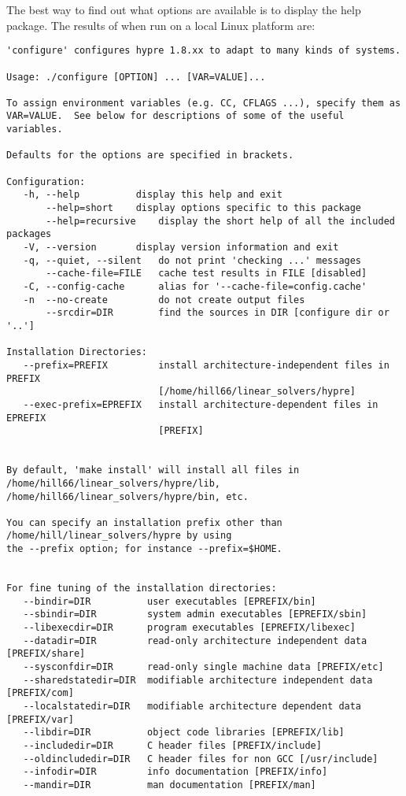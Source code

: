 The best way to find out what options are available is to display the help package.
The results of  when run on a local Linux platform are:
\begin{verbatim}
'configure' configures hypre 1.8.xx to adapt to many kinds of systems.

Usage: ./configure [OPTION] ... [VAR=VALUE]...

To assign environment variables (e.g. CC, CFLAGS ...), specify them as
VAR=VALUE.  See below for descriptions of some of the useful variables.

Defaults for the options are specified in brackets.

Configuration:
   -h, --help		   display this help and exit
       --help=short	   display options specific to this package
       --help=recursive	   display the short help of all the included packages
   -V, --version	   display version information and exit
   -q, --quiet, --silent   do not print 'checking ...' messages
       --cache-file=FILE   cache test results in FILE [disabled]
   -C, --config-cache      alias for '--cache-file=config.cache'
   -n  --no-create         do not create output files
       --srcdir=DIR        find the sources in DIR [configure dir or '..']

Installation Directories:
   --prefix=PREFIX         install architecture-independent files in PREFIX
                           [/home/hill66/linear_solvers/hypre]
   --exec-prefix=EPREFIX   install architecture-dependent files in EPREFIX 
                           [PREFIX]


By default, 'make install' will install all files in
/home/hill66/linear_solvers/hypre/lib, /home/hill66/linear_solvers/hypre/bin, etc.

You can specify an installation prefix other than /home/hill/linear_solvers/hypre by using 
the --prefix option; for instance --prefix=$HOME.


For fine tuning of the installation directories:
   --bindir=DIR          user executables [EPREFIX/bin]
   --sbindir=DIR         system admin executables [EPREFIX/sbin]
   --libexecdir=DIR      program executables [EPREFIX/libexec]
   --datadir=DIR         read-only architecture independent data [PREFIX/share]
   --sysconfdir=DIR      read-only single machine data [PREFIX/etc]
   --sharedstatedir=DIR  modifiable architecture independent data [PREFIX/com]
   --localstatedir=DIR   modifiable architecture dependent data [PREFIX/var]
   --libdir=DIR          object code libraries [EPREFIX/lib]
   --includedir=DIR      C header files [PREFIX/include]
   --oldincludedir=DIR   C header files for non GCC [/usr/include]
   --infodir=DIR         info documentation [PREFIX/info]
   --mandir=DIR          man documentation [PREFIX/man]



\end{verbatim}
